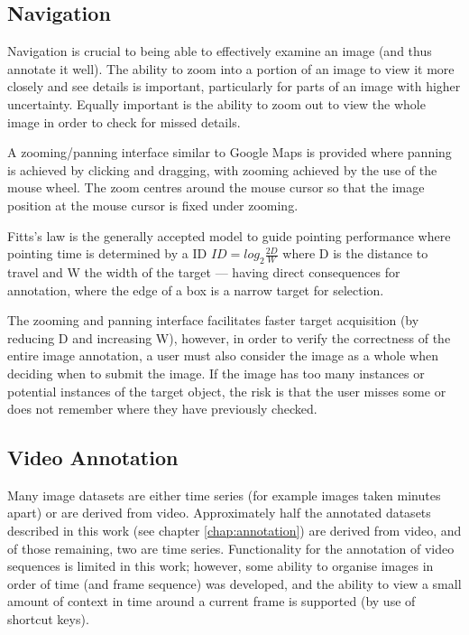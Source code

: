 \subsection {Navigation}

Navigation is crucial to being able to effectively examine an image (and thus annotate it well). The ability to zoom into a portion of an image to view it more closely and see details is important, particularly for parts of an image with higher uncertainty. Equally important is the ability to zoom out to view the whole image in order to check for missed details. 

A zooming/panning interface similar to Google Maps is provided where panning is achieved by clicking and dragging, with zooming achieved by the use of the mouse wheel. The zoom centres around the mouse cursor so that the image position at the mouse cursor is fixed under zooming.

Fitts's law is the generally accepted model to guide pointing performance where pointing time is determined by a \gls{ID} $ ID = log_2 \frac{2D}{W} $ where D is the distance to travel and W the width of the target --- having direct consequences for annotation, where the edge of a box is a narrow target for selection. 

The zooming and panning interface facilitates faster target acquisition (by reducing D and increasing W), however, in order to verify the correctness of the entire image annotation, a user must also consider the image as a whole when deciding when to submit the image. If the image has too many instances or potential instances of the target object, the risk is that the user misses some or does not remember where they have previously checked. 


\subsection {Video Annotation}

Many image datasets are either time series (for example images taken minutes apart) or are derived from video.  Approximately half the annotated datasets described in this work (see chapter \ref{chap:annotation})  are derived from video, and of those remaining, two are time series. Functionality for the annotation of video sequences is limited in this work; however, some ability to organise images in order of time (and frame sequence) was developed, and the ability to view a small amount of context in time around a current frame is supported (by use of shortcut keys).

